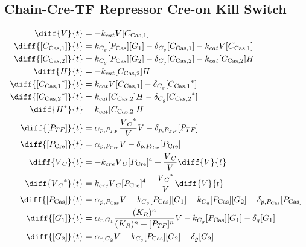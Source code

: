 \subsection{Chain-Cre-TF Repressor Cre-on Kill Switch}
\label{s:Chain_Cre_TF_Repressor_Cre_on_Kill_Switch}

\begin{align}
\diff{\vectorGen{}}{t} & = - \casCutRate{{}}\vectorGen{}\conc{\cplx{\cas}{1}}\\
\diff{\conc{\cplx{\cas}{1}}}{t} & =  \gRnaBind{}\conc{\proSp{\cas{}}}\conc{\gRna{1}} - \casCompDegradeRate{}\conc{\cplx{\cas}{1}} - \casCutRate{{}}\vectorGen{}\conc{\cplx{\cas}{1}}\\
\diff{\conc{\cplx{\cas}{2}}}{t} & =  \gRnaBind{}\conc{\proSp{\cas{}}}\conc{\gRna{2}} - \casCompDegradeRate{}\conc{\cplx{\cas}{2}} - \casCutRate{{}}\conc{\cplx{\cas}{2}}\hostGen{}\\
\diff{\hostGen{}}{t} & = - \casCutRate{{}}\conc{\cplx{\cas}{2}}\hostGen{}\\
\diff{\conc{\bound{\cplx{\cas}{1}}}}{t} & =  \casCutRate{{}}\vectorGen{}\conc{\cplx{\cas}{1}} - \casCompDegradeRate{}\conc{\bound{\cplx{\cas}{1}}}\\
\diff{\conc{\bound{\cplx{\cas}{2}}}}{t} & =  \casCutRate{{}}\conc{\cplx{\cas}{2}}\hostGen{} - \casCompDegradeRate{}\conc{\bound{\cplx{\cas}{2}}}\\
\diff{\edited{\hostGen{}}}{t} & =  \casCutRate{{}}\conc{\cplx{\cas}{2}}\hostGen{}\\
\diff{\conc{\proSp{TF}}}{t} & =  \txtlRate{\proSp{TF}}\frac{\edited{\vectorGen{}_C}}{\vectorGen{}}\vectorGen{} - \proDegradeRate{\proSp{TF}}\conc{\proSp{TF}}\\
\diff{\conc{\proSp{\cre{}}}}{t} & =  \txtlRate{\proSp{\cre{}}}\vectorGen{} - \proDegradeRate{\proSp{\cre{}}}\conc{\proSp{\cre{}}}\\
\diff{\vectorGen{}_C}{t} & = - \creCutRate{} \vectorGen{}_C \conc{\proSp{\cre{}}}^4 + \frac{\vectorGen{}_C}{\vectorGen{}} \diff{\vectorGen{}}{t}\\
\diff{\edited{\vectorGen{}_C}}{t} & =  \creCutRate{} \vectorGen{}_C \conc{\proSp{\cre{}}}^4 + \frac{\edited{\vectorGen{}_C}}{\vectorGen{}} \diff{\vectorGen{}}{t}\\
\diff{\conc{\proSp{\cas{}}}}{t} & =  \txtlRate{\proSp{\cas{}}}\vectorGen{} - \gRnaBind{}\conc{\proSp{\cas{}}}\conc{\gRna{1}} - \gRnaBind{}\conc{\proSp{\cas{}}}\conc{\gRna{2}} - \proDegradeRate{\proSp{\cas{}}}\conc{\proSp{\cas{}}}\\
\diff{\conc{\gRna{1}}}{t} & =  \txRate{\gRna{1}}\frac{(K_R)^n}{(K_R)^n + \conc{\proSp{TF}}^n}\vectorGen{} - \gRnaBind{}\conc{\proSp{\cas{}}}\conc{\gRna{1}} - \rnaDegradeRate{}\conc{\gRna{1}}\\
\diff{\conc{\gRna{2}}}{t} & =  \txRate{\gRna{2}}\vectorGen{} - \gRnaBind{}\conc{\proSp{\cas{}}}\conc{\gRna{2}} - \rnaDegradeRate{}\conc{\gRna{2}}
\end{align}

